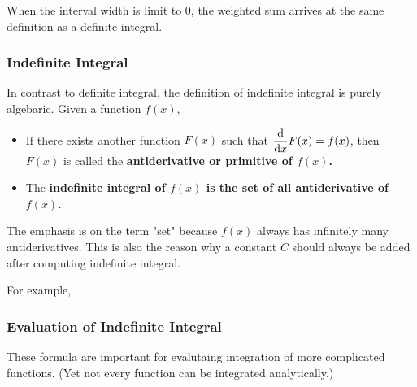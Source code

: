 \documentclass[class=article, crop=false, 12pt]{standalone}
\begin{document}
When the interval width is limit to $0$, the weighted sum arrives at the same definition as a definite integral. 


\subsubsection{Indefinite Integral}

In contrast to definite integral, the definition of indefinite integral is purely algebaric. Given a function $f(x)$, 

\begin{itemize}
    \item If there exists another function $F(x)$ such that $\dvv{x}F(x) = f(x)$,
    then $F(x)$ is called the \bf{antiderivative} or \bf{primitive} of $f(x)$.

    \item The \bf{indefinite integral} of $f(x)$ is the \bf{set of all antiderivative of $f(x)$}. 
    
\end{itemize}

The emphasis is on the term "set" because $f(x)$ always has infinitely many antiderivatives.
This is also the reason why a constant $C$ should always be added after computing indefinite integral.

\newpage
For example,


\subsubsection{Evaluation of Indefinite Integral}

These formula are important for evalutaing integration of more complicated functions.
(Yet not every function can be integrated analytically.)
\end{document}
